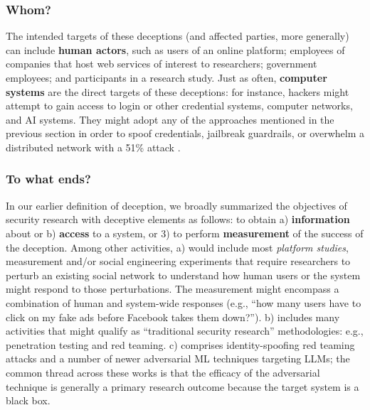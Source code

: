 \subsubsection{Whom?}

The intended targets of these deceptions (and affected parties, more generally) can include \textbf{human actors}, such as users of an online platform; employees of companies that host web services of interest to researchers; government employees; and participants in a research study. Just as often, \textbf{computer systems} are the direct targets of these deceptions: for instance, hackers might attempt to gain access to login or other credential systems, computer networks, and AI systems. They might adopt any of the approaches mentioned in the previous section in order to spoof credentials, jailbreak guardrails, or overwhelm a distributed network with a 51\% attack \cite{aponte202151}. 


\subsubsection{To what ends?}
In our earlier definition of deception, we broadly summarized the objectives of security research with deceptive elements as follows: 
to obtain a) \textbf{information} about or b) \textbf{access} to a system, or 3) to perform \textbf{measurement} of the success of the deception. Among other activities, a) would include most \textit{platform studies}, measurement and/or social engineering experiments that require researchers to perturb an existing social network to understand how human users or the system might respond to those perturbations. The measurement might encompass a combination of human and system-wide responses (e.g., ``how many users have to click on my fake ads before Facebook takes them down?''). b) includes many activities that might qualify as ``traditional security research'' methodologies: e.g., penetration testing and red teaming. c) comprises identity-spoofing red teaming attacks and a number of newer adversarial ML techniques targeting LLMs; the common thread across these works is that the efficacy of the adversarial technique is generally a primary research outcome because the target system is a black box. 


